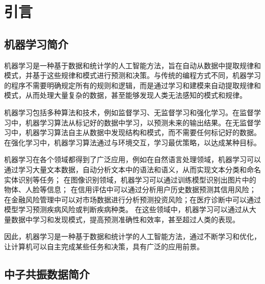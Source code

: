 \chapter{引言}
\label{chap01}
\section{机器学习简介}
机器学习\cite{mitchell2007machine}是一种基于数据和统计学的人工智能方法，旨在自动从数据中提取规律和模式，并基于这些规律和模式进行预测和决策。与传统的编程方式不同，机器学习的程序不需要明确规定所有的规则和逻辑，而是通过学习和建模来自动提取规律和模式，从而处理大量复杂的数据，甚至能够发现人类无法感知的模式和规律\cite{李航2012统计学习方法}。

机器学习包括多种算法和技术，例如监督学习、无监督学习和强化学习。在监督学习中，机器学习算法从标记好的数据中学习，以预测未来的输出结果。在无监督学习中，机器学习算法自主从数据中发现结构和模式，而不需要任何标记好的数据。在强化学习中，机器学习算法通过与环境交互，学习最优策略，以达成某种目标。

机器学习在各个领域都得到了广泛应用，例如在自然语言处理\cite{chowdhary2020natural}领域，机器学习可以通过学习大量文本数据，自动分析文本中的语法和语义，从而实现文本分类和命名实体识别\cite{刘浏2018命名实体识别研究综述}等任务；
在图像识别领域，机器学习可以通过训练模型识别出图片中的物体、人脸等信息；
在信用评估中可以通过分析用户历史数据预测其信用风险；
在金融风险管理中可以对市场数据进行分析预测投资风险；在医疗诊断中可以通过模型学习预测疾病风险或判断疾病种类。
在这些领域中，机器学习可以通过从大量数据中学习和发现模式，提高预测准确性和效率，甚至超过人类的表现。

因此，机器学习是一种基于数据和统计学的人工智能方法，通过不断学习和优化，让计算机可以自主完成某些任务和决策，具有广泛的应用前景。

\section{中子共振数据简介}


